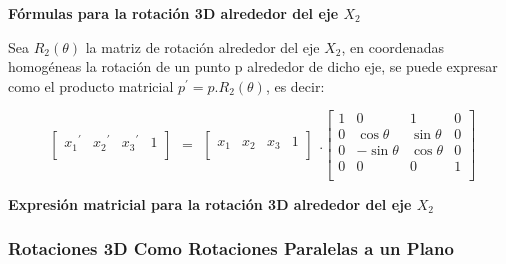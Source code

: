 \begin{center}
\textbf{\footnotesize{Fórmulas para la rotación 3D alrededor del eje $X_{2}$}}
\end{center}


Sea $R_{2}( \theta )$ la matriz de rotación alrededor del eje $X_{2}$, en coordenadas homogéneas la rotación de un punto p alrededor de dicho eje, se puede expresar como el producto matricial $p^{\prime} = p.R_{2}(\theta)$, es decir:

\begin{equation}
\begin{array}{rccl}
\left[
\begin{array}{rccl}
{x_{1}}^{\prime} & {x_{2}}^{\prime} & {x_{3}}^{\prime} & 1\\
\end{array}
\right]
\end{array}
=
\begin{array}{rccl}
\left[
\begin{array}{rccl}
x_{1} & x_{2} & x_{3} & 1\\
\end{array}
\right]
\end{array} 
.
\left[
\begin{array}{rccl}
1 & 0 & 1 & 0\\
0 & \cos\theta & \sin\theta &  0\\
0 & -\sin\theta & \cos\theta & 0 \\
0 & 0 & 0 & 1\\
\end{array}
\right]
\end{equation}

\begin{center}
\textbf{\footnotesize{Expresión matricial para la rotación 3D alrededor del eje $X_{2}$}}
\end{center}

\subsubsection{Rotaciones 3D Como Rotaciones Paralelas a un Plano}


